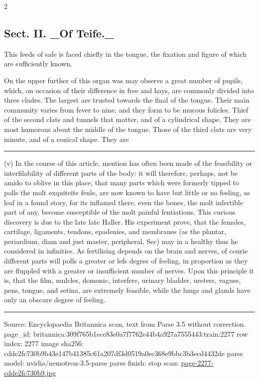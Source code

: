 \documentclass[10pt]{article}
\begin{document}
\begin{multicols}{2}\raggedcolumns
\subsection*{Sect. II. \_Of Teife.\_}
This feeds of safe is faced chiefly in the tongue, the fixation and figure of which are sufficiently known.

On the upper further of this organ was may observe a great number of pupils, which, on occasion of their difference in free and hays, are commonly divided into three clades. The largest are trusted towards the final of the tongue. Their main community varies from fever to nine, and they form to be mucous folicles. Thief of the second clats and tunnels that matter, and of a cylindrical shape. They are most humorous about the middle of the tongue. Those of the third clats are very minute, and of a conical shape. They are

\end{multicols}
\par\vspace{4pt}\noindent\rule{0.3\linewidth}{0.4pt}\par
{\footnotesize
(v) In the course of this article, mention has often been made of the feasibility or interfilability of different parts of the body: it will therefore, perhaps, not be amido to oblive in this place, that many parts which were formerly tipped to polls the molt exquiteite fenle, are now known to have but little or no feeling, as leaf in a found story, for its inflamed there, even the bones, the molt infertible part of any, become susceptible of the molt painful fentiations. This curious discovery is due to the late late Haller. His experiment prove, that the females, cartilage, ligaments, tendons, epadenies, and membranes (as the plantar, periardium, diam and just master, peripheral, Sec) may in a healthy thus he considered in infinities. As fertilising depends on the brain and nerves, of courie different parts will polls a greater or lefs degree of feeling, in proportion as they are fluppled with a greater or insufficient number of nerves. Upon this principle it is, that the film, mulcles, domonic, interfere, urinary bladder, ureters, vagues, pens, tongue, and setina, are extremely feasible, while the lungs and glands have only an obscure degree of feeling.\par}
\vfill\par\noindent\rule{\linewidth}{0.4pt}\par
{\scriptsize\color{gray}\noindent Source: Encyclopaedia Britannica scan, text from Parse 3.5 without correction. page\_id: britannica:309f765b1ecc83e0a7f7762e44b4a927a7555443:train:2277 \quad row index: 2277 \quad image sha256: cdde2fc730b9b43e147b41385c61a207df3d0519a0ec368e9bbc3b3ecd4432de \quad parse model: nvidia/nemotron-3.5-parse \quad parse finish: stop \quad scan: \href{../scans/page-2277-cdde2fc730b9.jpg}{page-2277-cdde2fc730b9.jpg}\par}
\end{document}
